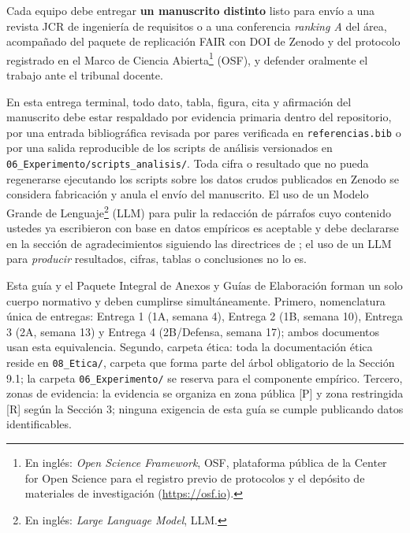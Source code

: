 \documentclass[11pt,a4paper]{article}
\newcounter{secc}
\begin{document}
\begin{finbox}[title=Objetivo de esta entrega en una sola frase]
    Cada equipo debe entregar \textbf{un manuscrito distinto} listo para envío a una revista JCR de ingeniería de requisitos o a una conferencia \emph{ranking A} del área, acompañado del paquete de replicación FAIR con DOI de Zenodo y del protocolo registrado en el Marco de Ciencia Abierta\footnote{En inglés: \emph{Open Science Framework}, OSF, plataforma pública de la Center for Open Science para el registro previo de protocolos y el depósito de materiales de investigación (\url{https://osf.io}).} (OSF), y defender oralmente el trabajo ante el tribunal docente.
\end{finbox}

\begin{alertbox}[title=Advertencia global sobre la integridad del manuscrito]
    En esta entrega terminal, todo dato, tabla, figura, cita y afirmación del manuscrito debe estar respaldado por evidencia primaria dentro del repositorio, por una entrada bibliográfica revisada por pares verificada en \texttt{referencias.bib} o por una salida reproducible de los scripts de análisis versionados en \texttt{06\_Experimento/scripts\_analisis/}.
    Toda cifra o resultado que no pueda regenerarse ejecutando los scripts sobre los datos crudos publicados en Zenodo se considera fabricación y anula el envío del manuscrito.
    El uso de un Modelo Grande de Lenguaje\footnote{En inglés: \emph{Large Language Model}, LLM.} (LLM) para pulir la redacción de párrafos cuyo contenido ustedes ya escribieron con base en datos empíricos es aceptable y debe declararse en la sección de agradecimientos siguiendo las directrices de \cite{elsevier_ai_2023,springer_ai_2023}; el uso de un LLM para \emph{producir} resultados, cifras, tablas o conclusiones no lo es.
\end{alertbox}

\begin{notabox}[title=Cláusula de armonización con el Paquete de Anexos y Guías de Aprobación Ética]
    Esta guía y el Paquete Integral de Anexos y Guías de Elaboración forman un solo cuerpo normativo y deben cumplirse simultáneamente.
    Primero, nomenclatura única de entregas: Entrega 1 (1A, semana 4), Entrega 2 (1B, semana 10), Entrega 3 (2A, semana 13) y Entrega 4 (2B/Defensa, semana 17); ambos documentos usan esta equivalencia.
    Segundo, carpeta ética: toda la documentación ética reside en \texttt{08\_Etica/}, carpeta que forma parte del árbol obligatorio de la Sección 9.1; la carpeta \texttt{06\_Experimento/} se reserva para el componente empírico.
    Tercero, zonas de evidencia: la evidencia se organiza en zona pública [P] y zona restringida [R] según la Sección 3; ninguna exigencia de esta guía se cumple publicando datos identificables.
\end{notabox}
\end{document}
